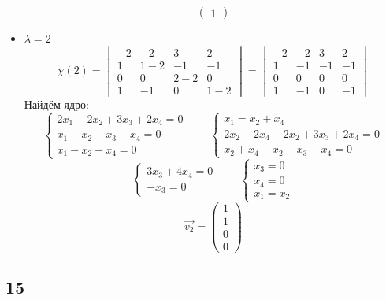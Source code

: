 \begin{itemize}
$$\begin{pmatrix}
        1
    \end{pmatrix} $$
    \item $ \lambda = 2 $
    $$ \chi(2) =
    \begin{vmatrix}
        -2 & -2 & 3 & 2 \\
        1 & 1 - 2 & -1 & -1 \\
        0 & 0 & 2 - 2 & 0 \\
        1 & -1 & 0 & 1 - 2
    \end{vmatrix} =
    \begin{vmatrix}
    	-2 & -2 & 3 & 2 \\
        1 & -1 & -1 & -1 \\
        0 & 0 & 0 & 0 \\
        1 & -1 & 0 & -1
    \end{vmatrix} $$
    Найдём ядро:
    $$
    \begin{cases}
    	2x_1 - 2x_2 + 3x_3 + 2x_4 = 0 \\
        x_1 - x_2 - x_3 - x_4 = 0 \\
        x_1 - x_2 - x_4 = 0
    \end{cases} \qquad
    \begin{cases}
    	x_1 = x_2 + x_4 \\
        2x_2 + 2x_4 - 2x_2 + 3x_3 + 2x_4 = 0 \\
        x_2 + x_4 - x_2 - x_3 - x_4 = 0
    \end{cases} $$
    $$
    \begin{cases}
    	3x_3 + 4x_4 = 0 \\
        -x_3 = 0
    \end{cases} \qquad
    \begin{cases}
    	x_3 = 0 \\
        x_4 = 0 \\
        x_1 = x_2
    \end{cases} $$
    $$ \vec{v_2} =
    \begin{pmatrix}
    	1 \\
        1 \\
        0 \\
        0
    \end{pmatrix} $$
\end{itemize}

\subsection{15}

